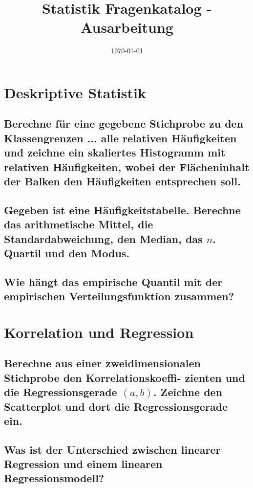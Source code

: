 \documentclass[a4paper,10pt]{article}
\title{Statistik Fragenkatalog - Ausarbeitung}
\author{}
\date{\today}
\begin{document}
  \maketitle
  \newpage
  \tableofcontents{}
  \newpage
\section{Deskriptive Statistik}
\subsection{Berechne für eine gegebene Stichprobe zu den Klassengrenzen ... alle relativen Häufigkeiten und zeichne ein skaliertes Histogramm
mit relativen Häufigkeiten, wobei der Flächeninhalt der Balken den Häufigkeiten entsprechen soll.}

\subsection{Gegeben ist eine Häufigkeitstabelle. Berechne das arithmetische Mittel, die Standardabweichung, den Median, das $n$. Quartil und den Modus.}

\subsection{Wie hängt das empirische Quantil mit der empirischen Verteilungsfunktion zusammen?}

\newpage
\section{Korrelation und Regression}
\subsection{Berechne aus einer zweidimensionalen Stichprobe den Korrelationskoeffi-
zienten und die Regressionsgerade $(a, b)$. Zeichne den Scatterplot und dort die
Regressionsgerade ein.}

\subsection{Was ist der Unterschied zwischen linearer Regression und einem linearen
Regressionsmodell?}
\end{document}
